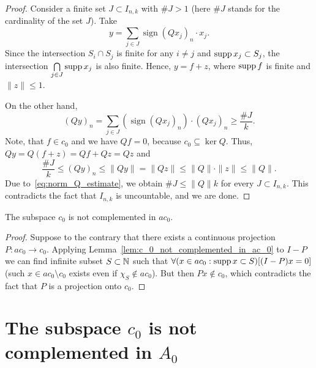 \begin{proof}
	Consider a finite set $J \subset I_{n,k}$ with $\#J>1$
	(here $\#J$ stands for the cardinality of the set $J$).
	Take
	\begin{equation}
		y = \sum_{j \in J} \operatorname{sign}{(Qx_j)_n} \cdot x_j
		.
	\end{equation}
	Since the intersection $S_i \cap S_j$ is finite for any $i \neq j$ and
	$\operatorname{supp} x_j \subset S_j$,
	the intersection $\bigcap\limits_{j\in J} \operatorname{supp} x_j$ is also finite.
	Hence, $y = f + z$,
	where $\operatorname{supp} f$ is finite and $\|z\| \leq 1$.

	On the other hand,
	\begin{equation}
		\label{eq:non_complemented_sum_cardinality}
		(Qy)_n = \sum_{j \in J}
		(\operatorname{sign}(Qx_j)_n)
		\cdot (Qx_j)_n \geq \frac{\# J}{k}
		.
	\end{equation}
	Note, that $f\in c_0$ and we have $Qf = 0$, because $c_0 \subseteq \ker Q$.
	Thus, $Qy = Q(f+z) = Qf + Qz = Qz$ and
	\begin{equation}
		\label{eq:norm_Q_estimate}
		\frac{\# J}{k} \leq (Qy)_n \leq \|Qy\| = \|Qz\| \leq \|Q\| \cdot \|z\| \leq \|Q\|
		.
	\end{equation}
	Due to~\eqref{eq:norm_Q_estimate}, we obtain $\# J \leq \|Q\| k$ for every $J\subset I_{n,k}$.
	This contradicts the fact that $I_{n,k}$ is uncountable,
	and we are done.
\end{proof}

\begin{theorem}
	The subspace $c_0$ is not complemented in $ac_0$.
\end{theorem}

\begin{proof}
	Suppose to the contrary that
	there exists a continuous projection $P: ac_0 \to c_0$.
	Applying Lemma~\ref{lem:c_0_not_complemented_in_ac_0} to $I-P$
	we can find infinite subset $S\subset\mathbb{N}$
	such that $\forall(x\in ac_0 : \operatorname{supp} x \subset S)[(I-P)x = 0]$
	(such $x \in ac_0 \setminus c_0$ exists even if $\chi_S \notin ac_0$).
	But then $Px\notin c_0$,
	which contradicts the fact that $P$ is a projection onto $c_0$.
\end{proof}







\section{The subspace $c_0$ is not complemented in $A_0$}
\label{sec:c0_in_A0}


